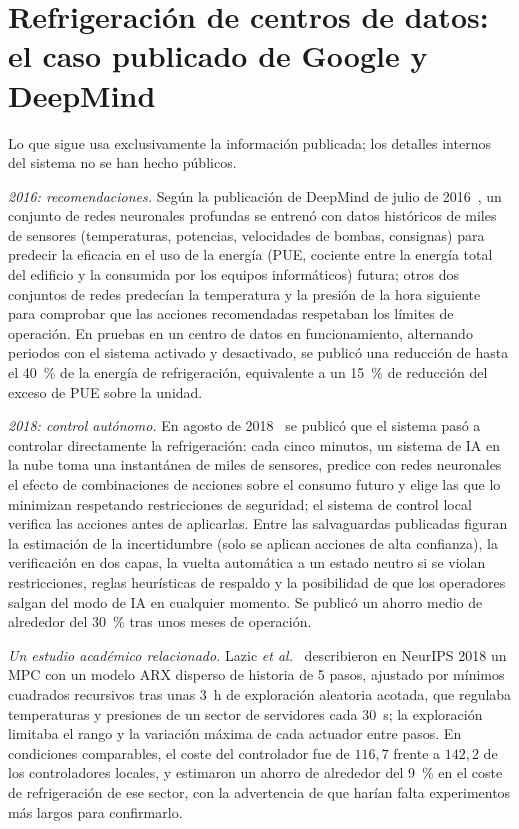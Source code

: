 \section{Refrigeración de centros de datos: el caso publicado de Google y DeepMind}

Lo que sigue usa exclusivamente la información publicada; los detalles internos del sistema no se han hecho públicos.

\emph{2016: recomendaciones.} Según la publicación de DeepMind de julio de 2016~\cite{evansgao}, un conjunto de redes neuronales profundas se entrenó con datos históricos de miles de sensores (temperaturas, potencias, velocidades de bombas, consignas) para predecir la eficacia en el uso de la energía (PUE, cociente entre la energía total del edificio y la consumida por los equipos informáticos) futura; otros dos conjuntos de redes predecían la temperatura y la presión de la hora siguiente para comprobar que las acciones recomendadas respetaban los límites de operación. En pruebas en un centro de datos en funcionamiento, alternando periodos con el sistema activado y desactivado, se publicó una reducción de hasta el 40~\% de la energía de refrigeración, equivalente a un 15~\% de reducción del exceso de PUE sobre la unidad.

\emph{2018: control autónomo.} En agosto de 2018~\cite{gamblegao} se publicó que el sistema pasó a controlar directamente la refrigeración: cada cinco minutos, un sistema de IA en la nube toma una instantánea de miles de sensores, predice con redes neuronales el efecto de combinaciones de acciones sobre el consumo futuro y elige las que lo minimizan respetando restricciones de seguridad; el sistema de control local verifica las acciones antes de aplicarlas. Entre las salvaguardas publicadas figuran la estimación de la incertidumbre (solo se aplican acciones de alta confianza), la verificación en dos capas, la vuelta automática a un estado neutro si se violan restricciones, reglas heurísticas de respaldo y la posibilidad de que los operadores salgan del modo de IA en cualquier momento. Se publicó un ahorro medio de alrededor del 30~\% tras unos meses de operación.

\emph{Un estudio académico relacionado.} Lazic \emph{et al.}~\cite{lazic} describieron en NeurIPS 2018 un MPC con un modelo ARX disperso de historia de 5 pasos, ajustado por mínimos cuadrados recursivos tras unas 3~h de exploración aleatoria acotada, que regulaba temperaturas y presiones de un sector de servidores cada 30~s; la exploración limitaba el rango y la variación máxima de cada actuador entre pasos. En condiciones comparables, el coste del controlador fue de $116{,}7$ frente a $142{,}2$ de los controladores locales, y estimaron un ahorro de alrededor del 9~\% en el coste de refrigeración de ese sector, con la advertencia de que harían falta experimentos más largos para confirmarlo.

